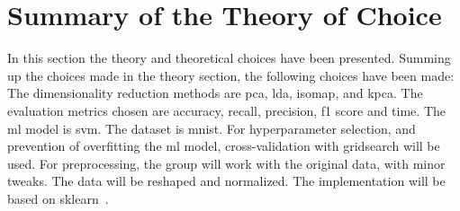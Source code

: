 \section{Summary of the Theory of Choice}\label{sec:theory-choice-summary}
In this section the theory and theoretical choices have been presented. Summing up the choices made in the theory section, the following choices have been made: The dimensionality reduction methods are \gls{pca}, \gls{lda}, \gls{isomap}, and \gls{kpca}. The evaluation metrics chosen are accuracy, recall, precision, f1 score and time. The \gls{ml} model is \gls{svm}. The dataset is \gls{mnist}. For hyperparameter selection, and prevention of overfitting the \gls{ml} model, cross-validation with gridsearch will be used. For preprocessing, the group will work with the original data, with minor tweaks. The data will be reshaped and normalized. The implementation will be based on \gls{sklearn}~\cite{scikit-learn}.